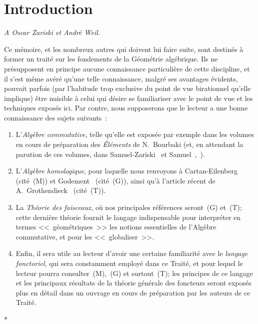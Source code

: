 \section*{Introduction}

\begin{center}
\emph{A Oscar Zariski et André Weil.}
\end{center}

Ce mémoire, et les nombreux autres qui doivent lui faire suite, sont destinés à former un traité sur les fondements de la Géométrie algébrique.
Ils ne présupposent en principe aucune connaissance particulière de cette discipline, et il s'est même avéré qu'une telle connaissance, malgré ses avantages évidents, pouvait parfois (par l'habitude trop exclusive du point de vue birationnel qu'elle implique) être nuisible à celui qui désire se familiariser avec le point de vue et les techniques exposés ici.
Par contre, nous supposerons que le lecteur a une bonne connaissance des sujets suivants~:

\begin{enumerate}
  \item[\textit{a)}] L'\emph{Algèbre commutative}, telle qu'elle est exposée par exemple dans les volumes en cours de préparation des \emph{Éléments} de N.~Bourbaki (et, en attendant la parution de ces volumes, dans Samuel-Zariski~\cite{I-13} et Samuel~\cite{I-11},~\cite{I-12}).
  \item[\textit{b)}] L'\emph{Algèbre homologique}, pour laquelle nous renvoyons à Cartan-Eilenberg~\cite{I-2} (cité~(M)) et Godement~\cite{I-4} (cité~(G)), ainsi qu'à l'article récent de A.~Grothendieck~\cite{I-6} (cité~(T)).
  \item[\textit{c)}] La \emph{Théorie des faisceaux}, où nos principales références seront~(G) et~(T); cette dernière théorie fournit le langage indispensable pour interpréter en termes <<~géométriques~>> les notions essentielles de l'Algèbre commutative, et pour les <<~globaliser~>>.
  \item[\textit{d)}] Enfin, il sera utile au lecteur d'avoir une certaine familiarité avec le \emph{langage fonctoriel}, qui sera constamment employé dans ce Traité, et pour lequel le lecteur pourra consulter~(M),~(G) et surtout~(T); les principes de ce langage et les principaux résultats de la théorie générale des foncteurs seront exposés plus en détail dans un ouvrage en cours de préparation par les auteurs de ce Traité.
\end{enumerate}

\bigskip
\begin{center}*\quad*\quad*\end{center}
\bigskip

